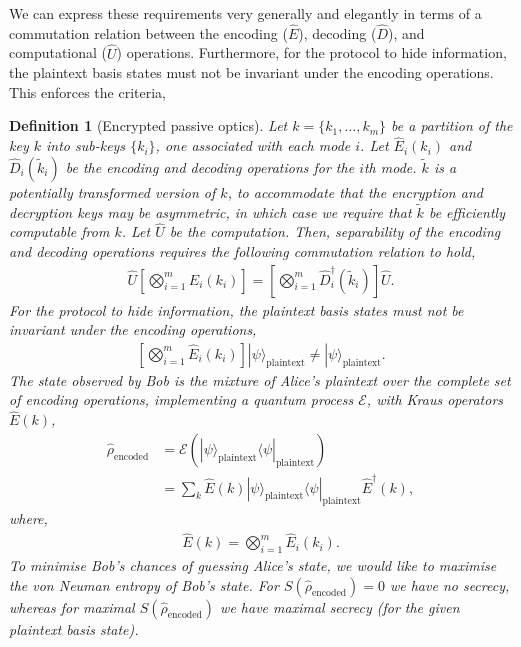 \documentclass[aps, rmp, twocolumn, amsmath, amssymb, nofootinbib, superscriptaddress, longbibliography, floatfix, table-of-contents, eqsecnum]{revtex4-1}
\newcommand{\bra}[1]{\langle#1|}
\newcommand{\ket}[1]{|#1\rangle}
\newtheorem{definition}{Definition}
\begin{document}
We can express these requirements very generally and elegantly in terms of a commutation relation between the encoding ($\hat{E}$), decoding ($\hat{D}$), and computational ($\hat{U}$) operations. Furthermore, for the protocol to hide information, the plaintext basis states must not be invariant under the encoding operations. This enforces the criteria,
\begin{definition}[Encrypted passive optics] \label{def:enc_pass}
Let \mbox{$k=\{k_1,\dots,k_m\}$} be a partition of the key $k$ into sub-keys $\{k_i\}$, one associated with each mode $i$. Let $\hat{E}_i(k_i)$ and $\hat{D}_i(\tilde k_i)$ be the encoding and decoding operations for the $i$th mode. $\tilde k$ is a potentially transformed version of $k$, to accommodate that the encryption and decryption keys may be asymmetric, in which case we require that $\tilde{k}$ be efficiently computable from $k$. Let $\hat{U}$ be the computation. Then, separability of the encoding and decoding operations requires the following commutation relation to hold,
\begin{align} \label{eq:gen_pass_hom}
\hat{U} \left[\bigotimes_{i=1}^m\hat{E}_i(k_i)\right] = \left[\bigotimes_{i=1}^m\hat{D}^\dag_i(\tilde k_i)\right] \hat{U}.
\end{align}
For the protocol to hide information, the plaintext basis states must not be invariant under the encoding operations,
\begin{align}
\left[\bigotimes_{i=1}^m\hat{E}_i(k_i)\right]\ket\psi_\text{plaintext} \neq \ket\psi_\text{plaintext}.
\end{align}
The state observed by Bob is the mixture of Alice's plaintext over the complete set of encoding operations, implementing a quantum process $\mathcal{E}$, with Kraus operators $\hat{E}(k)$,
\begin{align} \label{eq:mix_over_enc_ops}
\hat\rho_\text{encoded} &= \mathcal{E}(\ket\psi_\text{plaintext}\bra\psi_\text{plaintext}) \nonumber \\
&= \sum_k \hat{E}(k)\ket\psi_\text{plaintext}\bra\psi_\text{plaintext} \hat{E}^\dag(k),
\end{align}
where,
\begin{align}
\hat{E}(k) = \bigotimes_{i=1}^m\hat{E}_i(k_i).
\end{align}
To minimise Bob's chances of guessing Alice's state, we would like to maximise the von Neuman entropy of Bob's state. For \mbox{$S(\hat\rho_\text{encoded})=0$} we have no secrecy, whereas for maximal \mbox{$S(\hat\rho_\text{encoded})$} we have maximal secrecy (for the given plaintext basis state).
\end{definition} 
\end{document}
